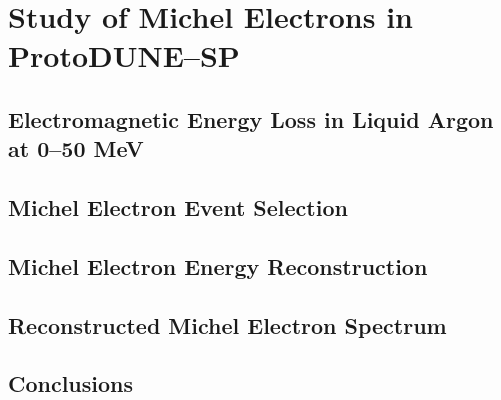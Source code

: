% 

\chapter{\label{ch:5-michel}Study of Michel Electrons in ProtoDUNE--SP} 

\minitoc

\section{Electromagnetic Energy Loss in Liquid Argon at 0--50 MeV}

\section{Michel Electron Event Selection}

\section{Michel Electron Energy Reconstruction}

\section{Reconstructed Michel Electron Spectrum}

\section{Conclusions}

